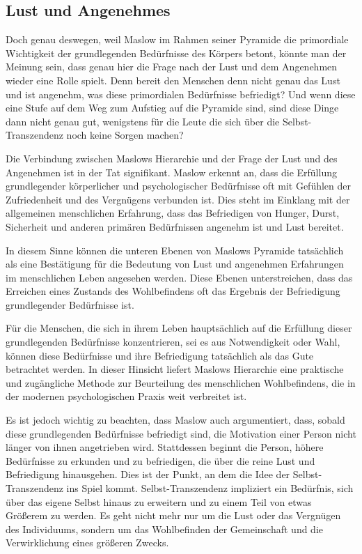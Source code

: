\documentclass[12pt,a4paper]{article}
\begin{document}
\subsection[short]{Lust und Angenehmes}
Doch genau deswegen, weil Maslow im Rahmen seiner Pyramide die primordiale Wichtigkeit der grundlegenden Bedürfnisse des Körpers betont, könnte man der Meinung sein, dass genau hier die Frage nach der Lust und dem Angenehmen wieder eine Rolle spielt. Denn bereit den Menschen denn nicht genau das Lust und ist angenehm, was diese primordialen Bedürfnisse befriedigt? Und wenn diese eine Stufe auf dem Weg zum Aufstieg auf die Pyramide sind, sind diese Dinge dann nicht genau gut, wenigstens für die Leute die sich über die Selbst-Transzendenz noch keine Sorgen machen?

Die Verbindung zwischen Maslows Hierarchie und der Frage der Lust und des Angenehmen ist in der Tat signifikant. Maslow erkennt an, dass die Erfüllung grundlegender körperlicher und psychologischer Bedürfnisse oft mit Gefühlen der Zufriedenheit und des Vergnügens verbunden ist. Dies steht im Einklang mit der allgemeinen menschlichen Erfahrung, dass das Befriedigen von Hunger, Durst, Sicherheit und anderen primären Bedürfnissen angenehm ist und Lust bereitet.

In diesem Sinne können die unteren Ebenen von Maslows Pyramide tatsächlich als eine Bestätigung für die Bedeutung von Lust und angenehmen Erfahrungen im menschlichen Leben angesehen werden. Diese Ebenen unterstreichen, dass das Erreichen eines Zustands des Wohlbefindens oft das Ergebnis der Befriedigung grundlegender Bedürfnisse ist.

Für die Menschen, die sich in ihrem Leben hauptsächlich auf die Erfüllung dieser grundlegenden Bedürfnisse konzentrieren, sei es aus Notwendigkeit oder Wahl, können diese Bedürfnisse und ihre Befriedigung tatsächlich als das Gute betrachtet werden. In dieser Hinsicht liefert Maslows Hierarchie eine praktische und zugängliche Methode zur Beurteilung des menschlichen Wohlbefindens, die in der modernen psychologischen Praxis weit verbreitet ist.

Es ist jedoch wichtig zu beachten, dass Maslow auch argumentiert, dass, sobald diese grundlegenden Bedürfnisse befriedigt sind, die Motivation einer Person nicht länger von ihnen angetrieben wird. Stattdessen beginnt die Person, höhere Bedürfnisse zu erkunden und zu befriedigen, die über die reine Lust und Befriedigung hinausgehen. Dies ist der Punkt, an dem die Idee der Selbst-Transzendenz ins Spiel kommt. Selbst-Transzendenz impliziert ein Bedürfnis, sich über das eigene Selbst hinaus zu erweitern und zu einem Teil von etwas Größerem zu werden. Es geht nicht mehr nur um die Lust oder das Vergnügen des Individuums, sondern um das Wohlbefinden der Gemeinschaft und die Verwirklichung eines größeren Zwecks.
\end{document}

